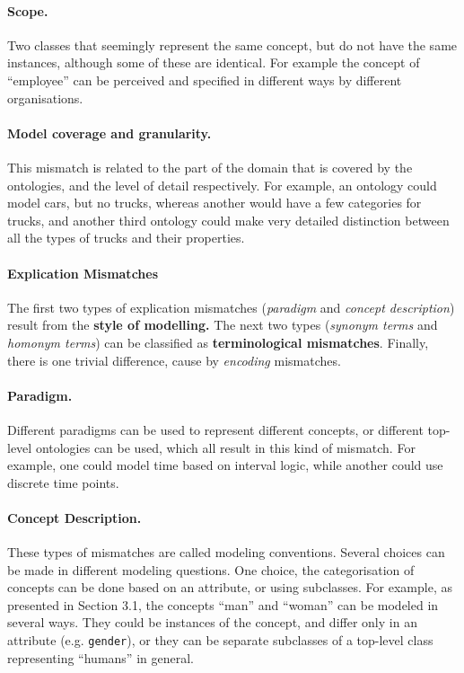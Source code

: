\paragraph{Scope.}

Two classes that seemingly represent the same concept, but do not have
the same instances, although some of these are identical. For example
the concept of {\textquotedblleft}employee{\textquotedblright} can be
perceived and specified in different ways by different organisations. 

\paragraph{Model coverage and granularity.}
This mismatch is related to the part of the domain that is covered by
the ontologies, and the level of detail respectively. For example, an
ontology could model cars, but no trucks, whereas another would have a
few categories for trucks, and another third ontology could make very
detailed distinction between all the types of trucks and their
properties. 

\paragraph{Explication Mismatches}
The first two types of explication mismatches (\textit{paradigm} and
\textit{concept description}) result from the \textbf{style of
modelling.} The next two types (\textit{synonym terms} and
\textit{homonym terms}) can be classified as \textbf{terminological
mismatches}. Finally, there is one trivial difference, cause by
\textit{encoding} mismatches. 

\paragraph{Paradigm.}
Different paradigms can be used to represent different concepts, or
different top-level ontologies can be used, which all result in this
kind of mismatch. For example, one could model time based on interval
logic, while another could use discrete time points. 

\paragraph{Concept Description.}
These types of mismatches are called modeling conventions. Several
choices can be made in different modeling questions. One choice, the
categorisation of concepts can be done based on an attribute, or using
subclasses. For example, as presented in Section 3.1, the concepts
{\textquotedblleft}man{\textquotedblright} and
{\textquotedblleft}woman{\textquotedblright} can be modeled in several
ways. They could be instances of the concept, and differ only in an
attribute (e.g. \texttt{gender}), or they can be separate
subclasses of a top-level class representing
{\textquotedblleft}humans{\textquotedblright} in general. 

